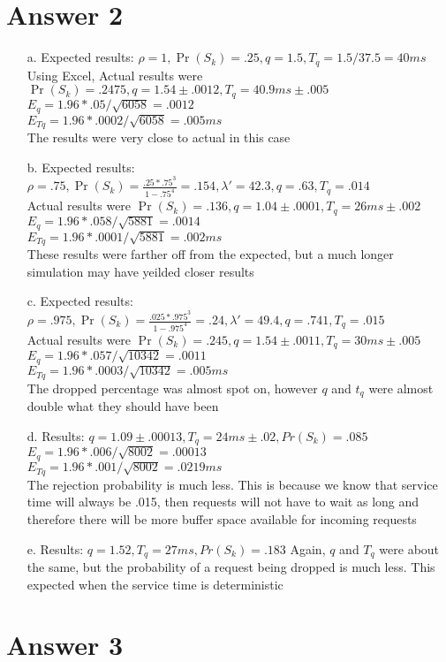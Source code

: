 \documentclass[11pt]{article}
\theoremstyle{definition}
\begin{document}
\section*{Answer 2}
\begin{enumerate}
	\item[a.] Expected results: $\rho = 1, \Pr(S_k) = .25, q = 1.5, T_q = 1.5/37.5 = 40ms$\\
	Using Excel, Actual results were $\Pr(S_k) = .2475, q = 1.54 \pm .0012, T_q = 40.9ms \pm .005$\\
	$E_q = 1.96 * .05 / \sqrt{6058} = .0012$\\
	$E_{Tq} = 1.96 * .0002 / \sqrt{6058} = .005ms$\\
	The results were very close to actual in this case\\
	
	\item[b.] Expected results: $\rho = .75, \Pr(S_k) = \frac{.25 * .75^3}{1 - .75^4} = .154, \lambda' = 42.3, q = .63, T_q = .014$\\
	Actual results were $\Pr(S_k) = .136, q = 1.04 \pm .0001, T_q = 26ms \pm .002$\\
	$E_q = 1.96 * .058 / \sqrt{5881} = .0014$\\
	$E_{Tq} = 1.96 * .0001 / \sqrt{5881} = .002ms$\\
	These results were farther off from the expected, but a much longer simulation may have yeilded closer results
	
	\item[c.] Expected results: $\rho = .975, \Pr(S_k) = \frac{.025 * .975^3}{1 -.975^4} = .24, \lambda' = 49.4, q = .741, T_q = .015$\\
	Actual results were $\Pr(S_k) = .245, q = 1.54 \pm .0011, T_q = 30ms \pm .005$\\
	$E_q = 1.96 * .057 / \sqrt{10342} = .0011$\\
	$E_{Tq} = 1.96 * .0003 / \sqrt{10342} = .005ms$\\
	The dropped percentage was almost spot on, however $q$ and $t_q$ were almost double what they should have been
	
	\item[d.] Results: $q = 1.09\pm .00013, T_q = 24ms \pm .02, Pr(S_k) = .085$
	$E_q = 1.96 * .006 / \sqrt{8002} = .00013$\\
	$E_{Tq} = 1.96 * .001 / \sqrt{8002} = .0219ms$\\
	The rejection probability is much less.  This is because we know that service time will always be .015, then requests will not have to wait as long and therefore	
	there will be more buffer space available for incoming requests
	
	\item[e.] Results: $q = 1.52, T_q = 27ms, Pr(S_k) = .183$
	Again, $q$ and $T_q$ were about the same, but the probability of a request being dropped is much less.  This expected when the service time is deterministic

\end{enumerate}

\section*{Answer 3}

	
\end{document}

